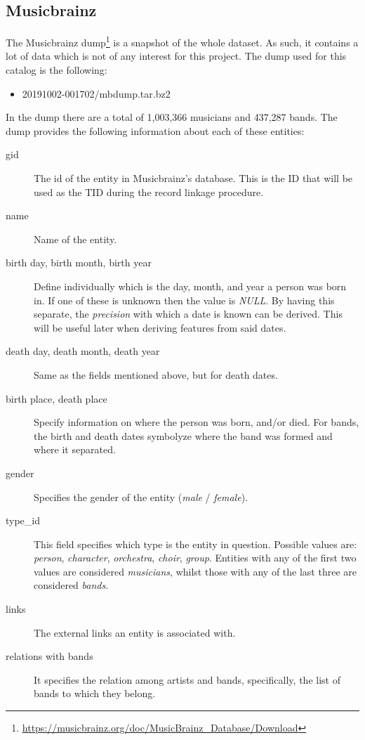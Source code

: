 \documentclass[epsfig,a4paper,11pt,titlepage,twoside,openany]{book}
\newcommand{\footurl}[1]{\footnote{\url{#1}}}
\begin{document}
\subsection{Musicbrainz}
\label{sec:shape-musicbrainz}

The Musicbrainz dump\footurl{https://musicbrainz.org/doc/MusicBrainz_Database/Download} is a snapshot of the whole dataset. As such, it contains a lot of data which is not of any interest for this project. The dump used for this catalog is the following:

\begin{itemize}
    \item 20191002-001702/mbdump.tar.bz2
\end{itemize}

In the dump there are a total of 1,003,366 musicians and 437,287 bands. The dump provides the following information about each of these entities:

\begin{description}
\item[gid] The id of the entity in Musicbrainz's database. This is the ID that will be used as the TID during the record linkage procedure. 

\item[name] Name of the entity.

\item[birth day, birth month, birth year] Define individually which is the day, month, and year a person was born in. If one of these is unknown then the value is \textit{NULL}. By having this separate, the \textit{precision} with which a date is known can be derived. This will be useful later when deriving features from said dates. 

\item[death day, death month, death year] Same as the fields mentioned above, but for death dates.

\item[birth place, death place] Specify information on where the person was born, and/or died. For bands, the birth and death dates symbolyze where the band was formed and where it separated.

\item[gender] Specifies the gender of the entity (\textit{male} / \textit{female}).

\item[type\_id] This field specifies which type is the entity in question. Possible values are: \textit{person}, \textit{character}, \textit{orchestra}, \textit{choir}, \textit{group}. Entities with any of the first two values are considered \textit{musicians}, whilst those with any of the last three are considered \textit{bands}.

\item[links] The external links an entity is associated with.

\item[relations with bands] It specifies the relation among artists and bands, specifically, the list of bands to which they belong. 
\end{description}
\end{document}
